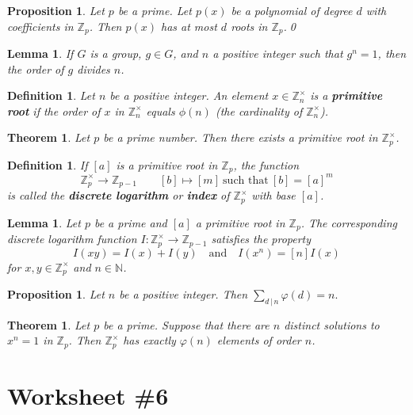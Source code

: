 \documentclass[12pt]{amsart}
\newcommand{\N}{\mathbb{N}}
\newcommand{\Z}{\mathbb{Z}}
\numberwithin{equation}{section}
\theoremstyle{plain} %
\newtheorem{thm}	[section]	{Theorem}
\newtheorem{lem}	[section]	{Lemma}
\newtheorem{prop}	[section]	{Proposition}
\newtheorem{defn}	[section]	{Definition}
\begin{document}
\begin{prop} Let $p$ be a prime. Let $p(x)$ be a polynomial of degree $d$ with coefficients in $\Z_p$. Then $p(x)$ has at most $d$ roots in $\Z_p$.\qed
\end{prop}

\begin{lem} If $G$ is a group, $g\in G$, and $n$ a positive integer such that $g^n=1$, then the order of $g$ divides $n$.
\end{lem}


\begin{defn} Let $n$ be a positive integer. An element $x \in \Z_n^\times$ is a \textbf{primitive root} if the order of $x$ in $\Z_n^\times$ equals $\phi(n)$ (the cardinality of $\Z_n^\times$).
\end{defn}

\begin{thm} Let $p$ be a prime number. Then there exists a primitive root in $\Z_p^\times$.
\end{thm}

\begin{defn} If $[a]$ is a primitive root in $\Z_p$, the function
\[ \Z_p^\times \to \Z_{p-1} \qquad [b]\mapsto [m] \ \text{such that} \ [b]=[a]^m\]
is called the \textbf{discrete logarithm} or \textbf{index} of $\Z_p^\times$ with base $[a]$.
\end{defn}

\begin{lem} Let $p$ be a prime and $[a]$ a primitive root in $\Z_p$. The corresponding discrete logarithm function $I: \Z_p^\times \to \Z_{p-1}$ satisfies the property
\[ I( xy) = I(x) + I(y) \quad \text{and} \quad I(x^n) = [n] I(x)\]
for $x,y\in \Z_p^\times$ and $n\in \N$.
\end{lem}


\begin{prop} Let $n$ be a positive integer. Then $\displaystyle \sum_{d \, |\, n} \varphi(d) = n.$
\end{prop}

\begin{thm} Let $p$ be a prime. Suppose that there are $n$ distinct solutions to $x^n=1$ in $\Z_p$. Then $\Z_p^\times$ has exactly $\varphi(n)$ elements of order $n$.
\end{thm}

\section*{Worksheet \#6}
\end{document}
